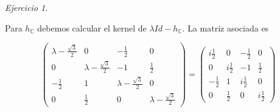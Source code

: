 \documentclass[11pt,a4paper]{article}
\theoremstyle{definition}
\theoremstyle{remark}
\newtheorem{exc}{Ejercicio}
\begin{document}
\begin{exc}
\begin{enumerate}
							Para $ h_\mathbb{C} $ debemos calcular el kernel de $ \lambda Id-h_\mathbb{C} $. La matriz asociada es
							
							\begin{equation}
							\begin{pmatrix}
					    	\lambda-\frac{\sqrt{3}}{2} & 0 & -\frac{1}{2} & 0
					    	\\ 0 & \lambda-\frac{\sqrt{3}}{2} & -1 & \frac{1}{2} 
					    	\\ -\frac{1}{2} & 1 & \lambda-\frac{\sqrt{3}}{2} & 0
					    	\\ 0 & \frac{1}{2} & 0 & \lambda-\frac{\sqrt{3}}{2}
					    	\end{pmatrix} = 
					    	\begin{pmatrix}
					    	i\frac{1}{2} & 0 & -\frac{1}{2} & 0
					    	\\ 0 & i\frac{1}{2} & -1 & \frac{1}{2} 
					    	\\ -\frac{1}{2} & 1 & i\frac{1}{2} & 0
					    	\\ 0 & \frac{1}{2} & 0 & i\frac{1}{2}
					    	\end{pmatrix} \nonumber
							\end{equation}
						

\end{enumerate}
\end{exc}
\end{document}
